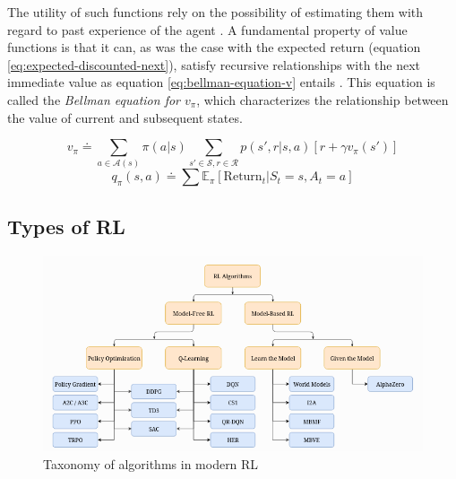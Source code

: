 The utility of such functions rely on the possibility of estimating them with regard to past experience of the agent \cite{suttonReinforcementLearningIntroduction2014}. A fundamental property of value functions is that it can, as was the case with the expected return (equation \ref{eq:expected-discounted-next}), satisfy recursive relationships with the next immediate value as equation \ref{eq:bellman-equation-v} entails \cite{suttonReinforcementLearningIntroduction2014}. This equation is called the \textit{Bellman equation for $v_\pi$}, which characterizes the relationship between the value of current and subsequent states.

\begin{equation} \label{eq:bellman-equation-v}
	v_\pi \doteq \sum_{a \in \mathcal{A}(s)} \pi(a|s) \sum_{s' \in \mathcal{S}, r \in \mathcal{R}} p(s',r|s,a) [r + \gamma v_\pi (s')]
\end{equation}
\begin{equation} \label{eq:action-value-function}
	q_\pi(s,a) \doteq \sum\mathbb{E}_\pi[\text{Return}_t | S_t = s, A_t = a]    
\end{equation}


\subsection{Types of \ac{RL}}


\begin{figure}
	\centering
	\includegraphics[width=0.75\linewidth]{./figures/rl_algorithms.png}
	\caption{Taxonomy of algorithms in modern \ac{RL} \cite{openaiSpinningDocumentation}}
	\label{fig:rl-algorithms}
\end{figure}

